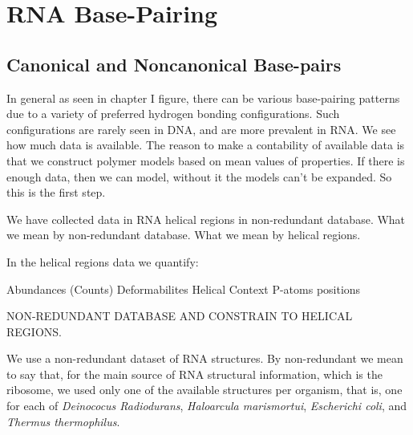 \chapter{RNA Base-Pairing}
\label{basepairs} 

\section{Canonical and Noncanonical Base-pairs}
In general as seen in chapter I figure, there can be various
base-pairing patterns due to a variety of preferred hydrogen bonding
configurations. Such configurations are rarely seen in DNA, and are
more prevalent in RNA.
We see how much data is available. The reason to make a contability of
available data is that we construct polymer models based on mean
values of properties. If there is enough data, then we can model,
without it the models can't be expanded. So this is the first step.

We have collected data in RNA helical regions in non-redundant
database.
What we mean by non-redundant database.
What we mean by helical regions.

In the helical regions data we quantify:

Abundances (Counts)
Deformabilites
Helical Context
P-atoms positions


NON-REDUNDANT DATABASE AND CONSTRAIN TO HELICAL REGIONS.

We use a non-redundant dataset of RNA structures.  By non-redundant we
mean to say  that, for the main source  of RNA structural information,
which is  the ribosome, we used  only one of  the available structures
per   organism,  that   is,   one  for   each  of   \textit{Deinococus
  Radiodurans},  \textit{Haloarcula  marismortui},  \textit{Escherichi
  coli},  and  \textit{Thermus thermophilus}.



